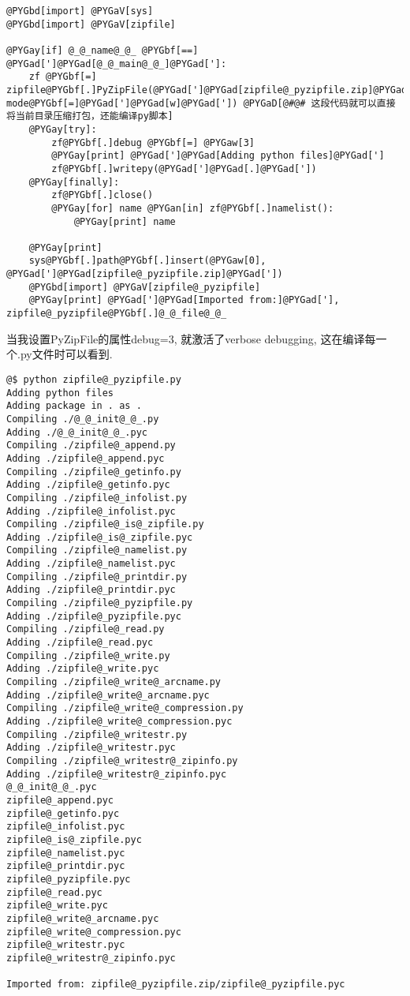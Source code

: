 \documentclass[a4paper,10pt,english]{manual}
\begin{document}
\begin{Verbatim}[commandchars=@\[\]]
@PYGbd[import] @PYGaV[sys]
@PYGbd[import] @PYGaV[zipfile]

@PYGay[if] @_@_name@_@_ @PYGbf[==] @PYGad[']@PYGad[@_@_main@_@_]@PYGad[']:
    zf @PYGbf[=] zipfile@PYGbf[.]PyZipFile(@PYGad[']@PYGad[zipfile@_pyzipfile.zip]@PYGad['], mode@PYGbf[=]@PYGad[']@PYGad[w]@PYGad[']) @PYGaD[@#@# 这段代码就可以直接将当前目录压缩打包，还能编译py脚本]
    @PYGay[try]:
        zf@PYGbf[.]debug @PYGbf[=] @PYGaw[3]
        @PYGay[print] @PYGad[']@PYGad[Adding python files]@PYGad[']
        zf@PYGbf[.]writepy(@PYGad[']@PYGad[.]@PYGad['])
    @PYGay[finally]:
        zf@PYGbf[.]close()
        @PYGay[for] name @PYGan[in] zf@PYGbf[.]namelist():
            @PYGay[print] name

    @PYGay[print]
    sys@PYGbf[.]path@PYGbf[.]insert(@PYGaw[0], @PYGad[']@PYGad[zipfile@_pyzipfile.zip]@PYGad['])
    @PYGbd[import] @PYGaV[zipfile@_pyzipfile]
    @PYGay[print] @PYGad[']@PYGad[Imported from:]@PYGad['], zipfile@_pyzipfile@PYGbf[.]@_@_file@_@_
\end{Verbatim}

当我设置PyZipFile的属性debug=3, 就激活了verbose debugging, 这在编译每一个.py文件时可以看到.

\begin{Verbatim}[commandchars=@\[\]]
@$ python zipfile@_pyzipfile.py
Adding python files
Adding package in . as .
Compiling ./@_@_init@_@_.py
Adding ./@_@_init@_@_.pyc
Compiling ./zipfile@_append.py
Adding ./zipfile@_append.pyc
Compiling ./zipfile@_getinfo.py
Adding ./zipfile@_getinfo.pyc
Compiling ./zipfile@_infolist.py
Adding ./zipfile@_infolist.pyc
Compiling ./zipfile@_is@_zipfile.py
Adding ./zipfile@_is@_zipfile.pyc
Compiling ./zipfile@_namelist.py
Adding ./zipfile@_namelist.pyc
Compiling ./zipfile@_printdir.py
Adding ./zipfile@_printdir.pyc
Compiling ./zipfile@_pyzipfile.py
Adding ./zipfile@_pyzipfile.pyc
Compiling ./zipfile@_read.py
Adding ./zipfile@_read.pyc
Compiling ./zipfile@_write.py
Adding ./zipfile@_write.pyc
Compiling ./zipfile@_write@_arcname.py
Adding ./zipfile@_write@_arcname.pyc
Compiling ./zipfile@_write@_compression.py
Adding ./zipfile@_write@_compression.pyc
Compiling ./zipfile@_writestr.py
Adding ./zipfile@_writestr.pyc
Compiling ./zipfile@_writestr@_zipinfo.py
Adding ./zipfile@_writestr@_zipinfo.pyc
@_@_init@_@_.pyc
zipfile@_append.pyc
zipfile@_getinfo.pyc
zipfile@_infolist.pyc
zipfile@_is@_zipfile.pyc
zipfile@_namelist.pyc
zipfile@_printdir.pyc
zipfile@_pyzipfile.pyc
zipfile@_read.pyc
zipfile@_write.pyc
zipfile@_write@_arcname.pyc
zipfile@_write@_compression.pyc
zipfile@_writestr.pyc
zipfile@_writestr@_zipinfo.pyc

Imported from: zipfile@_pyzipfile.zip/zipfile@_pyzipfile.pyc
\end{Verbatim}
\end{document}
